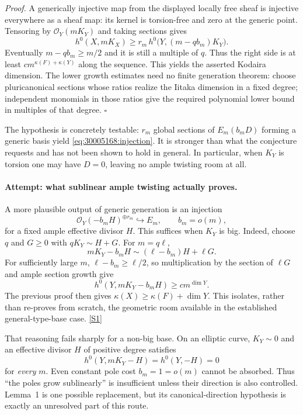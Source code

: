 \documentclass[11pt,a4paper]{article}
\newcommand{\sref}[2]{\hyperlink{source:#1:#2}{[S#2]}}
\numberwithin{equation}{section}
\begin{document}
\emph{Proof.} A generically injective map from the displayed locally free
sheaf is injective everywhere as a sheaf map: its kernel is torsion-free
and zero at the generic point. Tensoring by $\mathcal O_Y(mK_Y)$ and taking
sections gives
\[
 h^0(X,mK_X)\geq r_m\,
 h^0\bigl(Y,(m-qb_m)K_Y\bigr).
\]
Eventually $m-qb_m\geq m/2$ and it is still a multiple of $q$. Thus the
right side is at least $c m^{\kappa(F)+\kappa(Y)}$ along the sequence.
This yields the asserted Kodaira dimension. The lower growth estimates
need no finite generation theorem: choose pluricanonical sections whose
ratios realize the Iitaka dimension in a fixed degree; independent
monomials in those ratios give the required polynomial lower bound in
multiples of that degree. $\square$

The hypothesis is concretely testable: $r_m$ global sections of
$E_m(b_mD)$ forming a generic basis yield \eqref{eq:30005168:injection}.
It is stronger than what the conjecture requests and has not been shown
to hold in general. In particular, when $K_Y$ is torsion one may have
$D=0$, leaving no ample twisting room at all.

\paragraph{Attempt: what sublinear ample twisting actually proves.}
A more plausible output of generic generation is an injection
\[
 \mathcal O_Y(-b_mH)^{\oplus r_m}\hookrightarrow E_m,
 \qquad b_m=o(m),
\]
for a fixed ample effective divisor $H$. This suffices when $K_Y$ is big.
Indeed, choose $q$ and $G\geq0$ with $qK_Y\sim H+G$. For $m=q\ell$,
\[
 mK_Y-b_mH\sim(\ell-b_m)H+\ell G.
\]
For sufficiently large $m$, $\ell-b_m\geq\ell/2$, so multiplication by
the section of $\ell G$ and ample section growth give
\[
 h^0(Y,mK_Y-b_mH)\geq c m^{\dim Y}.
\]
The previous proof then gives $\kappa(X)\geq\kappa(F)+\dim Y$.
This isolates, rather than re-proves from scratch, the geometric room
available in the established general-type-base case. \sref{30005168}{1}

That reasoning fails sharply for a non-big base. On an elliptic curve,
$K_Y\sim0$ and an effective divisor $H$ of positive degree satisfies
\[
 h^0(Y,mK_Y-H)=h^0(Y,-H)=0
\]
for \emph{every} $m$. Even constant pole cost $b_m=1=o(m)$ cannot be
absorbed. Thus ``the poles grow sublinearly'' is insufficient unless
their direction is also controlled. Lemma~1 is one possible replacement,
but its canonical-direction hypothesis is exactly an unresolved part
of this route.
\end{document}
